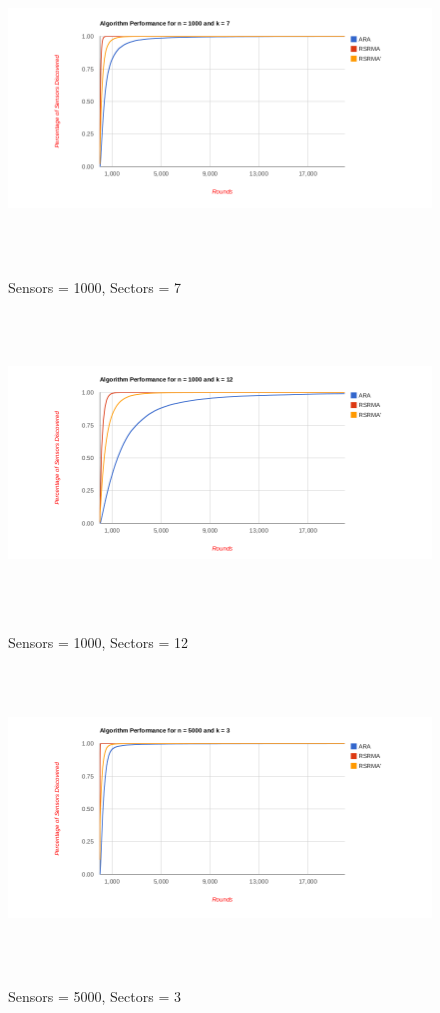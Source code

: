 \begin{figure}[ht]
\caption{Sensors = 1000, Sectors = 7}
\includegraphics[height = 8cm]{pics/graph1000k7.png}\\[0.5cm]   
\label{fig:n1000k7} 
\end{figure}

\begin{figure}[ht]
\caption{Sensors = 1000, Sectors = 12}
\includegraphics[height = 8cm]{pics/graph1000k12.png}\\[0.5cm] 
\label{fig:n1000k12}   
\end{figure}

\begin{figure}[ht]
\caption{Sensors = 5000, Sectors = 3}
\includegraphics[height = 8cm]{pics/graph5000k3.png}\\[0.5cm]    
\label{fig:n5000k3}
\end{figure}

